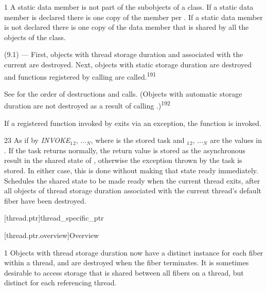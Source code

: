 \documentclass[fontsize=10pt,paper=A4,pagesize,DIV=15]{scrartcl}
\begin{document}
1 A static data member is not part of the subobjects of a class. If a
static data member is declared  there is one copy of
the member per . If a static data member is not declared
 there is one copy of the data member that is shared by all
the objects of the class.


(9.1) --- First, objects with thread storage duration and associated with the current
are destroyed. Next, objects with static storage duration are destroyed
and functions registered by calling
are called.\textsuperscript{191}

See  for the order of destructions and calls.
(Objects with automatic storage duration are not destroyed as a result of calling
.)\textsuperscript{192}

If a registered function invoked by  exits via an exception,
the function \termn is invoked.


23 \effects
As if by \emph{INVOKE}$_1$$_2$, $\dotsc$$_N$\cpp{)},
where  is the stored task and
$_1$$_2$, $\dotsc$$_N$ are the values in . If the task returns normally,
the return value is stored as the asynchronous result in the shared state of
\this, otherwise the exception thrown by the task is stored. In either
case, this is done without making that state ready immediately. Schedules
the shared state to be made ready when the current thread exits,
after all objects of thread storage duration associated with the current 
{thread's default fiber} have been destroyed.


\setcounter{section}{33}
\setcounter{subsection}{12}
\setcounter{secnumdepth}{4}

\cbstart

[thread.ptr]{thread\_specific\_ptr}

[thread.ptr.overview]{Overview}

1 Objects with thread storage duration now have a distinct instance for each
fiber within a thread, and are destroyed when the fiber terminates. It is
sometimes desirable to access storage that is shared between all fibers on a
thread, but distinct for each referencing thread.
\end{document}
